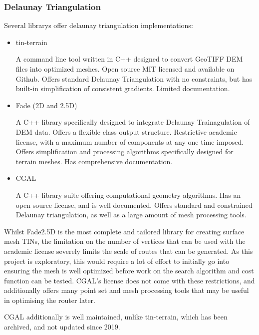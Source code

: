 \documentclass[12pt]{article}
\begin{document}
\subsubsection{Delaunay Triangulation}

Several librarys offer delaunay triangulation implementations:

\begin{itemize}

  \item tin-terrain

        A command line tool written in C++ designed to convert GeoTIFF DEM files into optimized meshes. Open source MIT licensed and available on Github. Offers standard Delaunay Triangulation with no constraints, but has built-in simplification of consistent gradients. Limited documentation.

  \item Fade (2D and 2.5D)

        A C++ library specifically designed to integrate Delaunay Trainagulation of DEM data. Offers a flexible class output structure. Restrictive academic license, with a maximum number of components at any one time imposed. Offers simplification and processing algorithms specifically designed for terrain meshes. Has comprehensive documentation.

  \item CGAL

        A C++ library suite offering computational geometry algorithms. Has an open source license, and is well documented. Offers standard and constrained Delaunay triangulation, as well as a large amount of mesh processing tools.

\end{itemize}

Whilst Fade2.5D is the most complete and tailored library for creating surface mesh TINs, the limitation on the number of vertices that can be used with the academic license severely limits the scale of routes that can be generated. As this project is exploratory, this would require a lot of effort to initially go into ensuring the mesh is well optimized before work on the search algorithm and cost function can be tested. CGAL's license does not come with these restrictions, and additionally offers many point set and mesh processing tools that may be useful in optimising the router later.

CGAL additionally is well maintained, unlike tin-terrain, which has been archived, and not updated since 2019.
\end{document}
